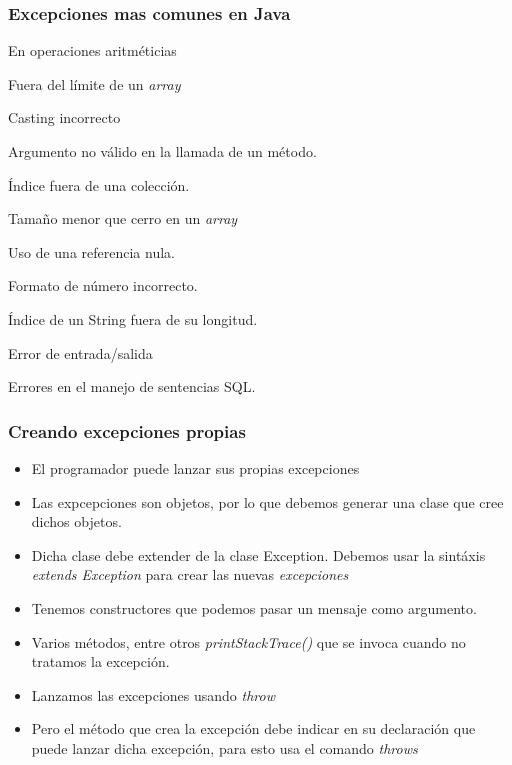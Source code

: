 \documentclass{beamer}
\begin{document}
\begin{frame}

\frametitle{Excepciones mas comunes en Java}
\begin{description}[<+->]
\item[AritmeticException] En operaciones aritméticias
\item[ArrayIndexOutOfBoundsException] Fuera del límite de un \emph{array}
\item[ClassCastException] Casting incorrecto
\item[IlegalArgumentException] Argumento no válido en la llamada de un método.
\item[IndexOutOfBoundsException] Índice fuera de una colección.
\item[NegativeArraySizeException] Tamaño menor que cerro en un \emph{array}
\item[NullPointerException] Uso de una referencia nula.
\item[NumberFormatException] Formato de número incorrecto.
\item[StringIndexOutOfBoundException] Índice de un String fuera de su longitud.
\item[IOException] Error de entrada/salida
\item[SQLException] Errores en el manejo de sentencias SQL.
\item[\dots]
\end{description}
\end{frame}

\begin{frame}[fragile]
\frametitle{Creando excepciones propias}
\begin{itemize}[<+->]
\item El programador puede lanzar sus propias excepciones
\item Las expcepciones son objetos, por lo que debemos generar una clase que cree dichos objetos.
\item Dicha clase debe extender de la clase Exception. Debemos usar la sintáxis \emph{extends Exception} para crear las nuevas \emph{excepciones}
\item Tenemos constructores que podemos pasar un mensaje como argumento.
\item Varios métodos, entre otros \emph{printStackTrace()} que se invoca cuando no tratamos la excepción.
\item Lanzamos las excepciones usando \emph{throw}
\item Pero el método que crea la excepción debe indicar en su declaración que puede lanzar dicha excepción, para esto usa el comando \emph{throws}
\end{itemize}
\end{frame}
\end{document}
